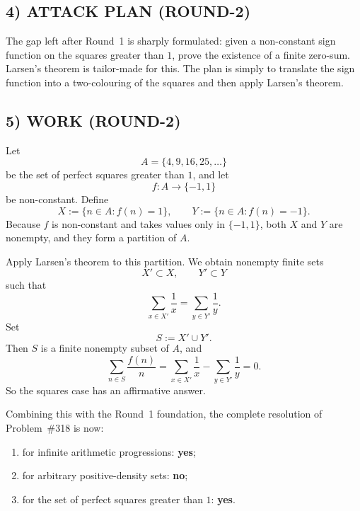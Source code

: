 \subsection*{4) ATTACK PLAN (ROUND-2)}
The gap left after Round~1 is sharply formulated: given a non-constant sign function on the squares greater than $1$, prove the existence of a finite zero-sum.  Larsen's theorem is tailor-made for this.  The plan is simply to translate the sign function into a two-colouring of the squares and then apply Larsen's theorem.

\subsection*{5) WORK (ROUND-2)}
Let
\[
A=\{4,9,16,25,\dots\}
\]
be the set of perfect squares greater than $1$, and let
\[
f:A\to\{-1,1\}
\]
be non-constant.
Define
\[
X:=\{n\in A: f(n)=1\},
\qquad
Y:=\{n\in A: f(n)=-1\}.
\]
Because $f$ is non-constant and takes values only in $\{-1,1\}$, both $X$ and $Y$ are nonempty, and they form a partition of $A$.

Apply Larsen's theorem to this partition.  We obtain nonempty finite sets
\[
X'\subset X,
\qquad
Y'\subset Y
\]
such that
\[
\sum_{x\in X'} \frac1x = \sum_{y\in Y'} \frac1y.
\]
Set
\[
S:=X'\cup Y'.
\]
Then $S$ is a finite nonempty subset of $A$, and
\[
\sum_{n\in S} \frac{f(n)}{n}
=
\sum_{x\in X'} \frac{1}{x}
-
\sum_{y\in Y'} \frac{1}{y}
=0.
\]
So the squares case has an affirmative answer.

Combining this with the Round~1 foundation, the complete resolution of Problem~\#318 is now:
\begin{enumerate}
\item for infinite arithmetic progressions: \textbf{yes};
\item for arbitrary positive-density sets: \textbf{no};
\item for the set of perfect squares greater than $1$: \textbf{yes}.
\end{enumerate}

